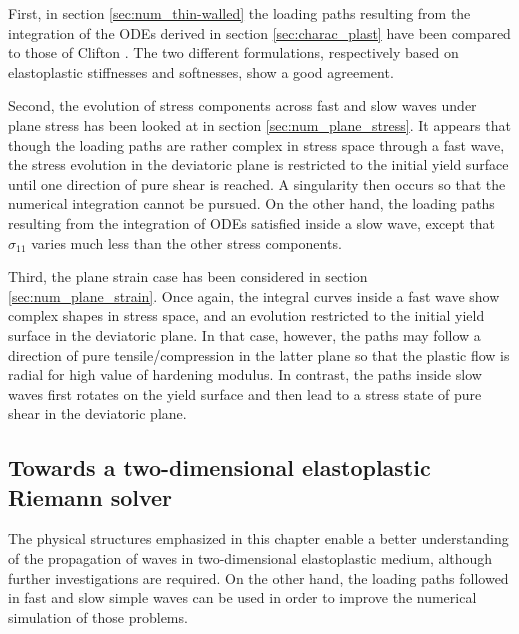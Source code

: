 First, in section \ref{sec:num_thin-walled} the loading paths resulting from the integration of the ODEs derived in section \ref{sec:charac_plast} have been compared to those of Clifton \cite{Clifton}.
The two different formulations, respectively based on elastoplastic stiffnesses and softnesses, show a good agreement.

Second, the evolution of stress components across fast and slow waves under plane stress has been looked at in section \ref{sec:num_plane_stress}.
It appears that though the loading paths are rather complex in stress space through a fast wave, the stress evolution in the deviatoric plane is restricted to the initial yield surface until one direction of pure shear is reached.
A singularity then occurs so that the numerical integration cannot be pursued.
On the other hand, the loading paths resulting from the integration of ODEs satisfied inside a slow wave, except that $\sigma_{11}$ varies much less than the other stress components.

Third, the plane strain case has been considered in section \ref{sec:num_plane_strain}.
Once again, the integral curves inside a fast wave show complex shapes in stress space, and an evolution restricted to the initial yield surface in the deviatoric plane.
In that case, however, the paths may follow a direction of pure tensile/compression in the latter plane so that the plastic flow is radial for high value of hardening modulus. 
In contrast, the paths inside slow waves first rotates on the yield surface and then lead to a stress state of pure shear in the deviatoric plane.

\subsection{Towards a two-dimensional elastoplastic Riemann solver}
The physical structures emphasized in this chapter enable a better understanding of the propagation of waves in two-dimensional elastoplastic medium, although further investigations are required.
On the other hand, the loading paths followed in fast and slow simple waves can be used in order to improve the numerical simulation of those problems.

